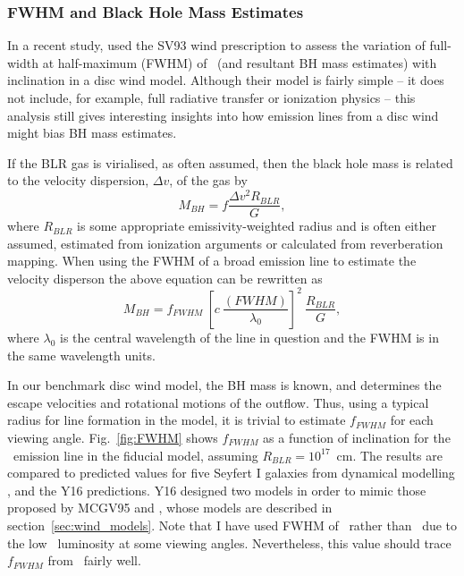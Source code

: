 \subsubsection{FWHM and Black Hole Mass Estimates}
\label{sec:model_fwhm}
In a recent study, \cite[hereafter Y16]{yong2016} used the SV93 wind prescription to
assess the variation of full-width at half-maximum (FWHM) of 
\hb\ (and resultant BH mass estimates)
with inclination in a disc wind model. 
Although their model is fairly simple -- 
it does not include, for example, full radiative transfer or ionization physics --
this analysis still gives interesting insights into how emission lines
from a disc wind might bias BH mass estimates.

If the BLR gas is virialised, as often assumed, then the black hole mass
is related to the velocity dispersion, $\Delta v$, of the gas by
\begin{equation}
M_{BH} = f \frac{\Delta v^2 R_{BLR}}{G},
\end{equation}
where $R_{BLR}$ is some appropriate emissivity-weighted radius and is often 
either assumed, estimated from ionization arguments or calculated from reverberation
mapping. When using the FWHM of a broad emission line to estimate the velocity disperson the above
equation can be rewritten as
\begin{equation}
M_{BH} = f_{FWHM}~\left[c~\frac{(FWHM)}{\lambda_0}\right]^2~\frac{R_{BLR}}{G},
\end{equation}
where $\lambda_0$ is the central wavelength of the line in question
and the FWHM is in the same wavelength units.

In our benchmark disc wind model, the BH mass is known, and determines
the escape velocities and rotational motions of the outflow. Thus, 
using a typical radius for line formation in the model, it is trivial to 
estimate $f_{FWHM}$ for each viewing angle. Fig.~\ref{fig:FWHM}
shows $f_{FWHM}$ as a function of inclination for the 
\ha\ emission line in the fiducial model, assuming $R_{BLR}=10^{17}$~cm. 
The results are compared to predicted values for five Seyfert I galaxies
from dynamical modelling \citep[][hereafter P14]{pancoast2014b}, 
and the Y16 predictions. Y16 designed two models 
in order to mimic those proposed by MCGV95 and \cite{elvis2000}, 
whose models are described in section~\ref{sec:wind_models}. 
Note that I have used FWHM of \ha\ rather than \hb\ due to the
low \hb\ luminosity at some viewing angles. Nevertheless,
this value should trace $f_{FWHM}$ from \hb\ fairly well.

